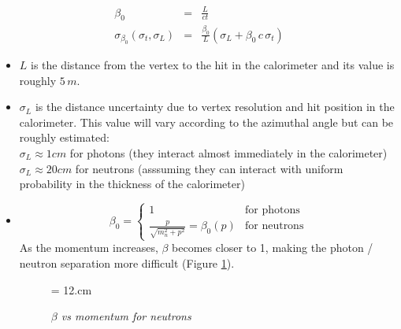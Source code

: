 \documentclass [12pt,letterpaper]{article}
\begin{document}
\begin{eqnarray}
\beta_0 & = & \frac{L}{c t } \\
\sigma_{\beta_0}(\sigma_{t}, \sigma_{L}) & = & \frac{\beta_0}{L} (\sigma_L + \beta_0 \, c \, \sigma_t) \label{eq:sigma_beta0}
\end{eqnarray}

\begin{itemize}
  \item $L$ is the distance from the vertex to the hit in the calorimeter and its value is roughly $5 \,m$.
  \item $\sigma_L$ is the distance uncertainty due to vertex resolution and hit position in the calorimeter. This value will vary according to the azimuthal angle but can be roughly estimated:\\
	$\sigma_L \approx 1cm$ for photons (they interact almost immediately in the calorimeter)\\
	$\sigma_L \approx 20cm$ for neutrons (asssuming they can interact with uniform probability in the thickness of the calorimeter)
  \item \begin{equation}
	\beta_0 = \left\{ \begin{array}{ll}
        	               1 &  \mbox{for photons} \\ 
                               \frac{p}{\sqrt{m_n^2 + p^2}} = \beta_0(p) & \mbox{for neutrons}
                           \end{array}
		    \right. \label{eq:beta0}
        \end{equation}
  As the momentum increases, $\beta$ becomes closer to 1, making the photon / neutron separation more difficult (Figure \ref{fig:beta_vs_p_neutron}).

\begin{figure} [h]
\begin{center}
\epsfxsize = 12.cm
\caption{\it $\beta$ vs momentum for neutrons} 
\label{fig:beta_vs_p_neutron}
\end{center}
\end{figure}

\end{itemize}
\end{document}
